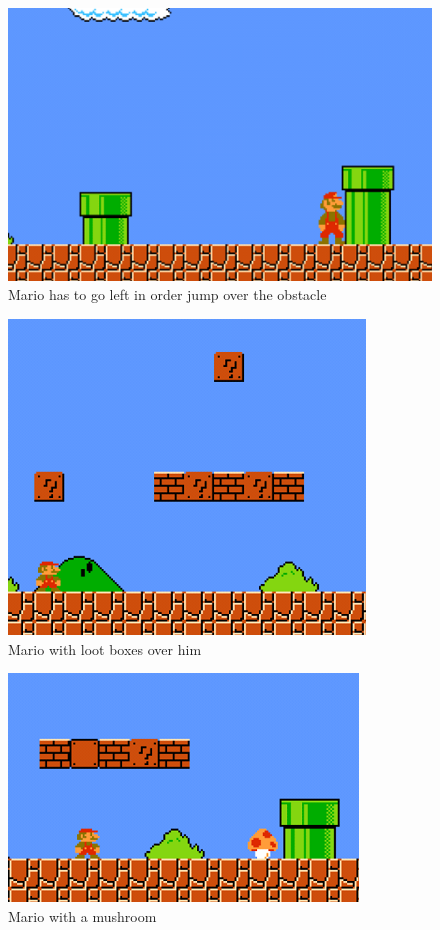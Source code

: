 \begin{figure}[!h]
	\centering
	\includegraphics[scale=0.55]{pictures/Mario1.PNG}
	\caption{Mario has to go left in order jump over the obstacle}
	\label{fig:marioLeft}
\end{figure}
\begin{figure}[!h]
	\centering
	\includegraphics[scale=0.55]{pictures/Mario2.PNG}
	\caption{Mario with loot boxes over him}
	\label{fig:marioSmashHead}
\end{figure}
\begin{figure}[!h]
	\centering
	\includegraphics[scale=0.55]{pictures/Mario3.PNG}
	\caption{Mario with a mushroom}
	\label{fig:marioEat}
\end{figure}
